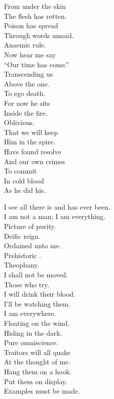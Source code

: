 From under the skin \\
The flesh has rotten. \\
Poison has spread \\
Through words unsaid. \\
Anaemic rule. \\
Now hear me say \\
``Our time has come.'' \\
Transcending us \\
Above the one. \\
To ego death. \\
For now he sits \\
Inside the fire. \\
Oblivious. \\
That we will keep \\
Him in the spire. \\
Have found resolve \\
And our own crimes \\
To commit \\
In cold blood \\
As he did his. \\




I see all there is and has ever been. \\
I am not a man; I am everything. \\
Picture of purity. \\

Deific reign. \\
Ordained unto me. \\
Prehistoric . \\
Theophany. \\
I shall not be moved. \\
Those who try. \\
I will drink their blood. \\

I'll be watching them. \\
I am everywhere. \\
Floating on the wind. \\
Hiding in the dark. \\
Pure omniscience. \\
Traitors will all quake \\
At the thought of me. \\
Hang them on a hook. \\
Put them on display. \\
Examples must be made. \\

